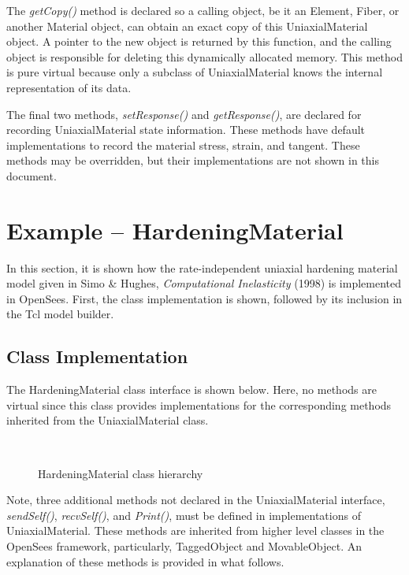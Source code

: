 \documentclass[12pt]{article}
\begin{document}
The {\em getCopy()} method is declared so a calling object, be it an Element, Fiber, or
another Material object, can obtain an exact copy of this UniaxialMaterial object. A pointer
to the new object is returned by this function, and the calling object is responsible for
deleting this dynamically allocated memory. This method is pure virtual because only
a subclass of UniaxialMaterial knows the internal representation of its data.

The final two methods, {\em setResponse()} and {\em getResponse()}, are declared for
recording UniaxialMaterial state information. These methods have default implementations
to record the material stress, strain, and tangent. These methods may be overridden, but
their implementations are not shown in this document.

\section{Example -- HardeningMaterial}
In this section, it is shown how the rate-independent uniaxial hardening material model
given in Simo \& Hughes, {\em Computational Inelasticity} (1998) is implemented in OpenSees.
First, the class implementation
is shown, followed by its inclusion in the Tcl model builder.

\subsection{Class Implementation}
The HardeningMaterial class interface is shown below. Here, no methods are virtual
since this class provides implementations for the corresponding methods inherited from
the UniaxialMaterial class.

\begin{figure}[htpb]
\begin{center}
\leavevmode
\hbox{%
}
\end{center}
\caption{HardeningMaterial class hierarchy}
\label{fig:Hardening}
\end{figure}

Note, three additional methods not declared in the UniaxialMaterial interface,
{\em sendSelf()}, {\em recvSelf()}, and {\em Print()}, must be defined in implementations 
of UniaxialMaterial. These methods are inherited from higher level classes in the OpenSees
framework, particularly, TaggedObject and MovableObject. An explanation of these methods
is provided in what follows.
\end{document}
